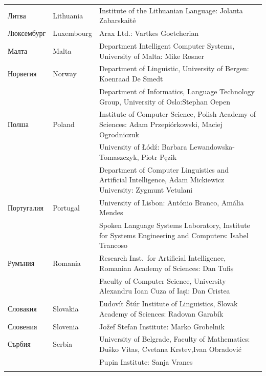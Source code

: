 \documentclass[]{../../metanetpaper}
\begin{document}
\begin{longtable}{@{}llp{110mm}@{}}
  Литва & \textcolor{grey1}{Lithuania} & Institute of the Lithuanian Language: Jolanta Zabarskaitė\\ \addlinespace
  Люксембург & \textcolor{grey1}{Luxembourg} & Arax Ltd.: Vartkes Goetcherian\\ \addlinespace
  Малта & \textcolor{grey1}{Malta} & Department Intelligent Computer Systems, University of Malta: Mike Rosner\\ \addlinespace
  Норвегия & \textcolor{grey1}{Norway} & Department of Linguistic, University of Bergen: Koenraad De Smedt\\ \addlinespace 
  & & Department of Informatics, Language Technology Group, University of Oslo:\newline Stephan Oepen \\ \addlinespace
  Полша & \textcolor{grey1}{Poland} & Institute of Computer Science, Polish Academy of Sciences: Adam Przepiórkowski, Maciej Ogrodniczuk \\ \addlinespace
  & & University of Łódź: Barbara Lewandowska-Tomaszczyk, Piotr Pęzik\\ \addlinespace
  & & Department of Computer Linguistics and Artificial Intelligence, Adam Mickiewicz University: Zygmunt Vetulani \\ \addlinespace
  Португалия & \textcolor{grey1}{Portugal} & University of Lisbon: António Branco, Amália Mendes \\ \addlinespace
  & & Spoken Language Systems Laboratory, Institute for Systems Engineering and Computers: Isabel Trancoso \\ \addlinespace
  Румъния & \textcolor{grey1}{Romania} & Research Inst.~for Artificial Intelligence, Romanian Academy of Sciences: Dan Tufiș \\ \addlinespace
  & & Faculty of Computer Science, University Alexandru Ioan Cuza of
  Iași: Dan Cristea \\ \addlinespace
  Словакия & \textcolor{grey1}{Slovakia} & Ľudovít Štúr Institute of Linguistics, Slovak Academy of Sciences: Radovan Garabík \\ \addlinespace 
  Словения & \textcolor{grey1}{Slovenia} & Jožef Stefan Institute: Marko Grobelnik \\ \addlinespace 
  Сърбия & \textcolor{grey1}{Serbia} & University of Belgrade, Faculty of Mathematics: Duško Vitas, Cvetana Krstev,\newline Ivan Obradović \\ \addlinespace
  & & Pupin Institute: Sanja Vranes \\ \addlinespace  

\end{longtable}
\end{document}
